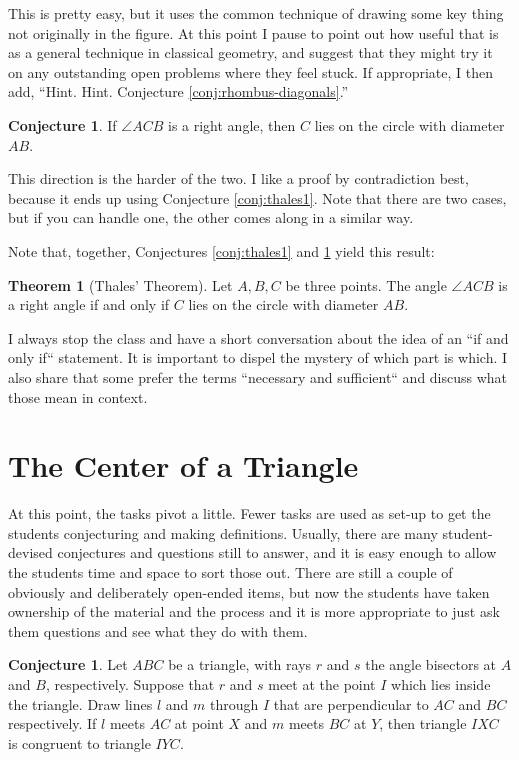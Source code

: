 \documentclass{tufte-handout}
\theoremstyle{definition}
\newtheorem{conjecture}[problem]{Conjecture}
\newtheorem*{theorem}{Theorem}
\begin{document}
This is pretty easy, but it uses the common technique of drawing some key thing not originally in the figure. At this point I pause to point out how useful that is as a general technique in classical geometry, and suggest that they might try it on any outstanding open problems where they feel stuck. If appropriate, I then add, ``Hint. Hint. Conjecture \ref{conj:rhombus-diagonals}.''

\begin{conjecture}
\label{conj:thales2}
If $\angle ACB$ is a right angle, then $C$ lies on the circle with diameter $AB$.
\end{conjecture}

This direction is the harder of the two. I like a proof by contradiction best, because it ends up using Conjecture \ref{conj:thales1}. Note that there are two cases, but if you can handle one, the other comes along in a similar way.

Note that, together, Conjectures \ref{conj:thales1} and \ref{conj:thales2} yield this result:
\begin{theorem}[Thales' Theorem] 
Let $A, B, C$ be three points. 
The angle $\angle ACB$ is a right angle if and only if $C$ lies on the circle with diameter $AB$.
\end{theorem}

I always stop the class and have a short conversation about 
the idea of an ``if and only if`` statement. It is important to dispel the mystery of which part is which. I also share 
that some prefer the terms ``necessary and sufficient`` and discuss what those mean in context.

\clearpage
\setcounter{section}{8}
\setcounter{problem}{0}
\section{The Center of a Triangle}

At this point, the tasks pivot a little. Fewer tasks are used as set-up to get the students conjecturing and making definitions. Usually, there are many student-devised conjectures and questions still to answer, and it is easy enough to allow the students time and space to sort those out. There are still a couple of obviously and deliberately open-ended items, but now the students have taken ownership of the material and the process and it is more appropriate to just ask them questions and see what they do with them.


\begin{conjecture}\label{conj:angle-bisectors-concurrent}
Let $ABC$ be a triangle, with rays $r$ and $s$ the angle bisectors at $A$ and $B$, respectively. Suppose that $r$ and $s$ meet at the point $I$ which lies inside the triangle. Draw lines $l$ and $m$ through $I$ that are perpendicular to $AC$ and $BC$ respectively. If $l$ meets $AC$ at point $X$ and $m$ meets $BC$ at $Y$, then triangle $IXC$ is congruent to triangle $IYC$.
\end{conjecture}
\end{document}
